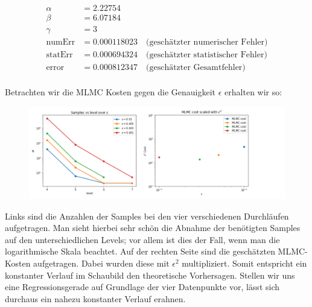 \begin{align*}
	\alpha  &=    2.22754   \\
	\beta   &=    6.07184   \\
	\gamma  &=    3   \\
\text{numErr}  &= 0.000118023   \quad \text{(geschätzter numerischer Fehler)}\\
\text{statErr} &= 0.000694324  \quad  \text{(geschätzter statistischer Fehler)}\\
\text{error}   &= 0.000812347  \quad  \text{(geschätzter Gesamtfehler)}\\
\end{align*}

Betrachten wir die MLMC Kosten gegen die Genauigkeit $ \epsilon $ erhalten wir so:
\begin{figure}[H]
	\centering
	\includegraphics[width=\textwidth]{plots/mlmctable.png} 
\end{figure}
Links sind die Anzahlen der Samples bei den vier verschiedenen Durchläufen aufgetragen. Man sieht hierbei sehr schön die Abnahme der benötigten Samples auf den unterschiedlichen Levels; vor allem ist dies der Fall, wenn man die logarithmische Skala beachtet. Auf der rechten Seite sind die geschätzten MLMC-Kosten aufgetragen. Dabei wurden diese mit $ \epsilon^2 $ multipliziert. Somit entspricht ein konstanter Verlauf im Schaubild den theoretische Vorhersagen. Stellen wir uns eine Regressionsgerade auf Grundlage der vier Datenpunkte vor, lässt sich durchaus ein nahezu konstanter Verlauf erahnen. 


